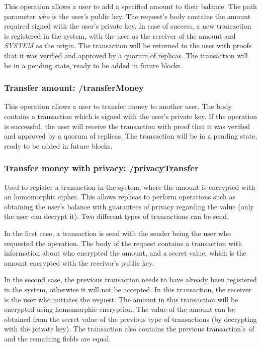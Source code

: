 \documentclass[10pt,journal,compsoc]{IEEEtran}
\begin{document}
	This operation allows a user to add a specified amount to their balance. The path parameter \textit{who} is the user's public key. The request's body contains the amount required signed with the user's private key. In case of success, a new transaction is registered in the system, with the user as the receiver of the amount and \textit{SYSTEM} as the origin. The transaction will be returned to the user with proofs that it was verified and approved by a quorum of replicas. The transaction will be in a pending state, ready to be added in future blocks.
	
	
	\subsubsection{Transfer amount: \textbf{/transferMoney}}
	
	This operation allows a user to transfer money to another user. The body contains a transaction which is signed with the user's private key. If the operation is successful, the user will receive the transaction with proof that it was verified and approved by a quorum of replicas. The transaction will be in a pending state, ready to be added in future blocks.
	
	\subsubsection{Transfer money with privacy: \textbf{/privacyTransfer}}
	Used to register a transaction in the system, where the amount is encrypted with an homomorphic cipher. This allows replicas to perform operations such as obtaining the user's balance with guarantees of privacy regarding the value (only the user can decrypt it). Two different types of transactions can be send. 
	
	In the first case, a transaction is send with the sender being the user who requested the operation. The body of the request contains a transaction with information about who encrypted the amount, and a secret value, which is the amount encrypted with the receiver's public key.
	
	In the second case, the previous transaction needs to have already been registered in the system, otherwise it will not be accepted. In this transaction, the receiver is the user who initiates the request. The amount in this transaction will be encrypted using homomorphic encryption. The value of the amount can be obtained from the secret value of the previous type of transactions (by decrypting with the private key). The transaction also contains the previous transaction's \textit{id} and the remaining fields are equal. 
	
\end{document}
